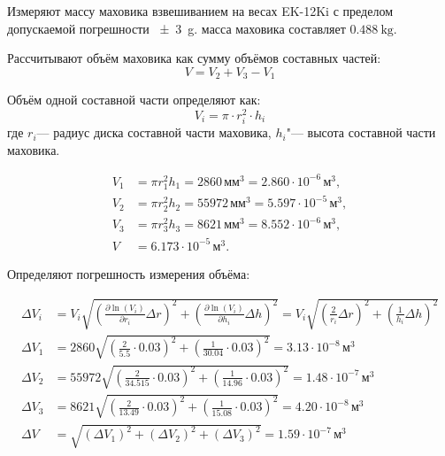 Измеряют массу маховика взвешиванием на весах EK-12Ki с пределом допускаемой погрешности \SI{\pm 3}{\gram}. масса маховика составляет $\SI{0,488}{\kilogram}$. 

Рассчитывают объём маховика как сумму объёмов составных частей:
\begin{equation}
	 V = V_2 + V_3 - V_1
\end{equation}

Объём одной составной части определяют как:
\begin{equation}
	V_i = \pi \cdot r_i^2 \cdot h_i
\end{equation}
где \(r_i\)--- радиус диска составной части маховика, \(h_i\)"--- высота составной части маховика.

\begin{equation}
 	\begin{aligned}
 		V_1 &= \pi r_1^2 h_1 = 2860 \,\text{мм}^3 = 2.860 \cdot 10^{-6}\,\text{м}^3, \\
 		V_2 &= \pi r_2^2 h_2 = 55972 \,\text{мм}^3 = 5.597 \cdot 10^{-5}\,\text{м}^3, \\
 		V_3 &= \pi r_3^2 h_3 = 8621 \,\text{мм}^3 = 8.552 \cdot 10^{-6}\,\text{м}^3, \\
 		V   &= 6.173 \cdot 10^{-5}\,\text{м}^3.
 	\end{aligned}
\end{equation}

Определяют погрешность измерения объёма:

\begin{equation}
	\begin{aligned}
		\Delta V_i &= V_i \sqrt{
			\left( \frac{\partial \ln(V_i)}{\partial r_i}\Delta r \right)^2 +
			\left( \frac{\partial \ln(V_i)}{\partial h_i}\Delta h \right)^2 }
		= V_i \sqrt{\left(\tfrac{2}{r_i}\Delta r\right)^2 + \left(\tfrac{1}{h_i}\Delta h\right)^2 } \\[1ex]
		\Delta V_1 &= 2860 \sqrt{ \left(\tfrac{2}{5.5}\cdot 0.03\right)^2 + \left(\tfrac{1}{30.04}\cdot 0.03\right)^2 }
		= 3.13 \cdot 10^{-8}\,\text{м}^3 \\[1ex]
		\Delta V_2 &= 55972 \sqrt{ \left(\tfrac{2}{34.515}\cdot 0.03\right)^2 + \left(\tfrac{1}{14.96}\cdot 0.03\right)^2 }
		= 1.48 \cdot 10^{-7}\,\text{м}^3 \\[1ex]
		\Delta V_3 &= 8621 \sqrt{ \left(\tfrac{2}{13.49}\cdot 0.03\right)^2 + \left(\tfrac{1}{15.08}\cdot 0.03\right)^2 }
		= 4.20 \cdot 10^{-8}\,\text{м}^3 \\[1ex]
		\Delta V   &= \sqrt{(\Delta V_1)^2 + (\Delta V_2)^2 + (\Delta V_3)^2}
		= 1.59 \cdot 10^{-7}\,\text{м}^3
	\end{aligned}
\end{equation}




